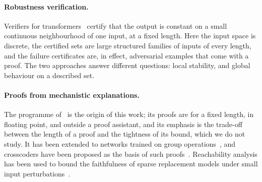 \documentclass[11pt,a4paper]{article}
\begin{document}
\paragraph{Robustness verification.}
Verifiers for transformers~\cite{shi2020robustness,bonaert2021deept} certify
that the output is constant on a small continuous neighbourhood of one input,
at a fixed length. Here the input space is discrete, the certified sets are
large structured families of inputs of every length, and the failure
certificates are, in effect, adversarial examples that come with a proof. The
two approaches answer different questions: local stability, and global
behaviour on a described set.

\paragraph{Proofs from mechanistic explanations.}
The programme of~\cite{gross2024compact} is the origin of this work; its proofs
are for a fixed length, in floating point, and outside a proof assistant, and
its emphasis is the trade-off between the length of a proof and the tightness of
its bound, which we do not study. It has been extended to networks trained on
group operations~\cite{wu2025groups}, and crosscoders have been proposed as the
basis of such proofs~\cite{manningcoe2026crosscoders}. Reachability analysis has
been used to bound the faithfulness of sparse replacement models under small
input perturbations~\cite{ladner2026misery}.
\end{document}
